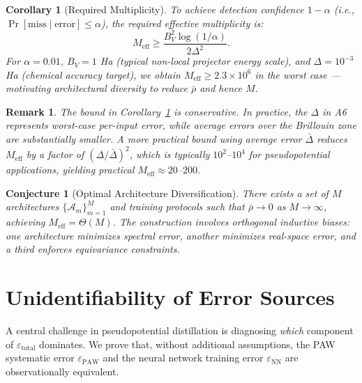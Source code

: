 \documentclass[11pt,a4paper]{article}
\newtheorem{corollary}[theorem]{Corollary}
\newtheorem{conjecture}[theorem]{Conjecture}
\newtheorem{remark}[theorem]{Remark}
\theoremstyle{definition}
\begin{document}
\begin{corollary}[Required Multiplicity]\label{cor:multiplicity}
To achieve detection confidence $1 - \alpha$ (i.e., $\Pr[\text{miss} \mid \text{error}] \leq \alpha$), the required effective multiplicity is:
\begin{equation}\label{eq:required_M}
M_{\mathrm{eff}} \geq \frac{B_V^2 \log(1/\alpha)}{2\Delta^2}.
\end{equation}
For $\alpha = 0.01$, $B_V = 1$ Ha (typical non-local projector energy scale), and $\Delta = 10^{-3}$ Ha (chemical accuracy target), we obtain $M_{\mathrm{eff}} \geq 2.3 \times 10^6$ in the worst case — motivating architectural diversity to reduce $\bar{\rho}$ and hence $M$.
\end{corollary}

\begin{remark}\label{rem:practical_M}
The bound in Corollary~\ref{cor:multiplicity} is conservative. In practice, the $\Delta$ in A6 represents \textit{worst-case} per-input error, while average errors over the Brillouin zone are substantially smaller. A more practical bound using average error $\bar{\Delta}$ reduces $M_{\mathrm{eff}}$ by a factor of $(\Delta/\bar{\Delta})^2$, which is typically $10^2$--$10^4$ for pseudopotential applications, yielding practical $M_{\mathrm{eff}} \approx 20$--$200$.
\end{remark}

\begin{conjecture}[Optimal Architecture Diversification]\label{conj:diversity}
There exists a set of $M$ architectures $\{\mathcal{A}_m\}_{m=1}^M$ and training protocols such that $\bar{\rho} \to 0$ as $M \to \infty$, achieving $M_{\mathrm{eff}} = \Theta(M)$. The construction involves orthogonal inductive biases: one architecture minimizes spectral error, another minimizes real-space error, and a third enforces equivariance constraints.
\end{conjecture}

\section{Unidentifiability of Error Sources }
\label{sec:unidentifiability}

A central challenge in pseudopotential distillation is diagnosing \textit{which} component of $\varepsilon_{\mathrm{total}}$ dominates. We prove that, without additional assumptions, the PAW systematic error $\varepsilon_{\mathrm{PAW}}$ and the neural network training error $\varepsilon_{\mathrm{NN}}$ are observationally equivalent.
\end{document}
